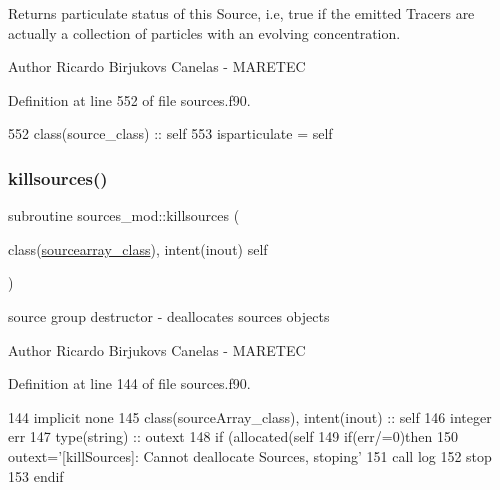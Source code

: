 Returns particulate status of this Source, i.\+e, true if the emitted Tracers are actually a collection of particles with an evolving concentration. 

\begin{DoxyAuthor}{Author}
Ricardo Birjukovs Canelas -\/ M\+A\+R\+E\+T\+EC 
\end{DoxyAuthor}


Definition at line 552 of file sources.\+f90.


\begin{DoxyCode}
552     \textcolor{keywordtype}{class}(source\_class) :: self
553     isparticulate = self%
\end{DoxyCode}
\mbox{\label{namespacesources__mod_aee745aa084adcfa41ecfc3469b90aa8e}} 
\subsubsection{\texorpdfstring{killsources()}{killsources()}}
{\footnotesize\ttfamily subroutine sources\+\_\+mod\+::killsources (\begin{DoxyParamCaption}\item[{class(\mbox{\hyperlink{structsources__mod_1_1sourcearray__class}{sourcearray\+\_\+class}}), intent(inout)}]{self }\end{DoxyParamCaption})\hspace{0.3cm}{\ttfamily [private]}}



source group destructor -\/ deallocates sources objects 

\begin{DoxyAuthor}{Author}
Ricardo Birjukovs Canelas -\/ M\+A\+R\+E\+T\+EC 
\end{DoxyAuthor}


Definition at line 144 of file sources.\+f90.


\begin{DoxyCode}
144     \textcolor{keywordtype}{implicit none}
145     \textcolor{keywordtype}{class}(sourceArray\_class), \textcolor{keywordtype}{intent(inout)} :: self
146     \textcolor{keywordtype}{integer} err
147     \textcolor{keywordtype}{type}(string) :: outext
148     \textcolor{keywordflow}{if} (\textcolor{keyword}{allocated}(self%
149     \textcolor{keywordflow}{if}(err/=0)\textcolor{keywordflow}{then}
150         outext=\textcolor{stringliteral}{'[killSources]: Cannot deallocate Sources, stoping'}
151         \textcolor{keyword}{call }log%
152         stop
153 \textcolor{keywordflow}{    endif}
\end{DoxyCode}
\mbox{\label{namespacesources__mod_a683ca7e4aca7a0050aad9f506569fca9}} 
